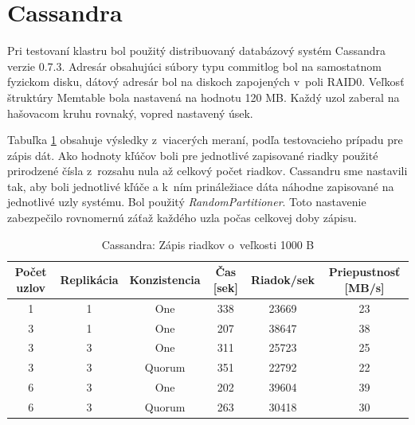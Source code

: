 \documentclass[11pt,twoside,a4paper]{book}
\begin{document}
\section{Cassandra}

Pri testovaní klastru bol použitý distribuovaný databázový systém Cassandra verzie 0.7.3. Adresár obsahujúci súbory typu commitlog bol na samostatnom fyzickom disku, dátový adresár bol na diskoch zapojených v~poli RAID0. Veľkosť štruktúry Memtable bola nastavená na hodnotu 120 MB. Každý uzol zaberal na hašovacom kruhu rovnaký, vopred nastavený úsek.

Tabuľka \ref{tab:CPerf2} obsahuje výsledky z~viacerých meraní, podľa testovacieho prípadu pre zápis dát. Ako hodnoty kľúčov boli pre jednotlivé zapisované riadky použité prirodzené čísla z~rozsahu nula až celkový počet riadkov. Cassandru sme nastavili tak, aby boli jednotlivé kľúče a k~ním prináležiace dáta náhodne zapisované na jednotlivé uzly systému. Bol použitý \emph{RandomPartitioner}. Toto nastavenie zabezpečilo rovnomernú záťaž každého uzla počas celkovej doby zápisu.

\begin{table}[hp]
\begin{center}
\begin{tabular}{|c|c|c|c|c|c|}
\hline Počet uzlov & Replikácia & Konzistencia & Čas [sek] & Riadok/sek & Priepustnosť [MB/s]\\ 
\hline
\hline 1 & 1 & One & 338 & 23669 & 23\\ 
\hline 3 & 1 & One & 207 & 38647 & 38\\ 
\hline 3 & 3 & One & 311 & 25723 & 25\\ 
\hline 3 & 3 & Quorum & 351 & 22792 & 22\\ 
\hline 6 & 3 & One & 202 & 39604 & 39\\ 
\hline 6 & 3 & Quorum & 263 & 30418 & 30\\ 
\hline
\end{tabular} 
\end{center}
\caption{Cassandra: Zápis riadkov o~veľkosti 1000 B}
\label{tab:CPerf2}
\end{table}
\end{document}
